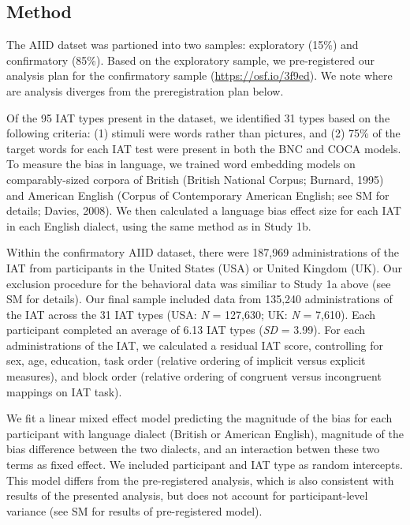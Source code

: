 \documentclass[man,floatsintext]{apa6}
\begin{document}
\hypertarget{method}{%
\subsection{Method}\label{method}}

The AIID datset was partioned into two samples: exploratory (15\%) and confirmatory (85\%). Based on the exploratory sample, we pre-registered our analysis plan for the confirmatory sample (\url{https://osf.io/3f9ed}). We note where are analysis diverges from the preregistration plan below.

Of the 95 IAT types present in the dataset, we identified 31 types based on the following criteria: (1) stimuli were words rather than pictures, and (2) 75\% of the target words for each IAT test were present in both the BNC and COCA models. To measure the bias in language, we trained word embedding models on comparably-sized corpora of British (British National Corpus; Burnard, 1995) and American English (Corpus of Contemporary American English; see SM for details; Davies, 2008). We then calculated a language bias effect size for each IAT in each English dialect, using the same method as in Study 1b.

Within the confirmatory AIID dataset, there were 187,969 administrations of the IAT from participants in the United States (USA) or United Kingdom (UK). Our exclusion procedure for the behavioral data was similiar to Study 1a above (see SM for details). Our final sample included data from 135,240 administrations of the IAT across the 31 IAT types (USA: \emph{N} = 127,630; UK: \emph{N} = 7,610). Each participant completed an average of 6.13 IAT types (\emph{SD} = 3.99). For each administrations of the IAT, we calculated a residual IAT score, controlling for sex, age, education, task order (relative ordering of implicit versus explicit measures), and block order (relative ordering of congruent versus incongruent mappings on IAT task).

We fit a linear mixed effect model predicting the magnitude of the bias for each participant with language dialect (British or American English), magnitude of the bias difference between the two dialects, and an interaction betwen these two terms as fixed effect. We included participant and IAT type as random intercepts. This model differs from the pre-registered analysis, which is also consistent with results of the presented analysis, but does not account for participant-level variance (see SM for results of pre-registered model).
\end{document}
